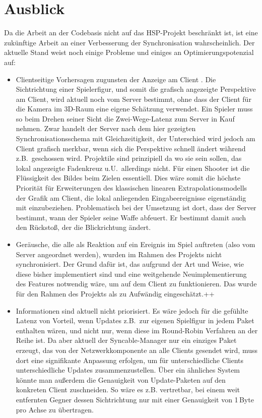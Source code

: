 \section{Ausblick}
Da die Arbeit an der Codebasis nicht auf das HSP-Projekt beschränkt ist, ist eine zukünftige Arbeit an einer Verbesserung der Synchronisation wahrscheinlich. Der aktuelle Stand weist noch einige Probleme und einiges an Optimierungspotenzial auf:
\begin{itemize}
\item Clientseitige Vorhersagen zugunsten der Anzeige am Client \cite[ch. 6.2]{gamenetworking00}. Die Sichtrichtung einer Spielerfigur, und somit die grafisch angezeigte Perspektive am Client, wird aktuell noch vom Server bestimmt, ohne dass der Client für die Kamera im 3D-Raum eine eigene Schätzung verwendet. 
Ein Spieler muss so beim Drehen seiner Sicht die Zwei-Wege-Latenz zum Server in Kauf nehmen. Zwar handelt der Server nach dem hier gezeigten Synchronisationsschema mit Gleichzeitigkeit, der Unterschied wird jedoch am Client grafisch merkbar, wenn sich die Perspektive schnell ändert während z.B.~geschossen wird. Projektile sind prinzipiell da wo sie sein sollen, das lokal angezeigte Fadenkreuz u.U.~allerdings nicht. Für einen Shooter ist die Flüssigkeit des Bildes  beim Zielen essentiell.
Dies wäre somit die höchste Priorität für Erweiterungen des klassischen linearen Extrapolationsmodells der Grafik am Client, die lokal anliegenden Eingabeereignisse eigenständig mit einzubeziehen. Problematisch bei der Umsetzung ist dort, dass der Server bestimmt, wann der Spieler seine Waffe abfeuert. Er bestimmt damit auch den Rückstoß, der die Blickrichtung ändert.
\item Geräusche, die alle als Reaktion auf ein Ereignis im Spiel auftreten (also vom Server angeordnet werden), wurden im Rahmen des Projekts nicht synchronisiert. Der Grund dafür ist, das aufgrund der Art und Weise, wie diese bisher implementiert sind und eine weitgehende Neuimplementierung des Features notwendig wäre, um auf dem Client zu funktionieren. Das wurde für den Rahmen des Projekts als zu Aufwändig eingeschätzt.++
\item Informationen sind aktuell nicht priorisiert. Es wäre jedoch für die gefühlte Latenz von Vorteil, wenn Updates z.B.~zur eigenen Spielfigur in jedem Paket enthalten wären, und nicht nur, wenn diese im Round-Robin Verfahren an der Reihe ist. Da aber aktuell der Syncable-Manager nur ein einziges Paket erzeugt, das von der Netzwerkkomponente an alle Clients gesendet wird, muss dort eine signifikante Anpassung erfolgen, um für unterschiedliche Clients unterschiedliche Updates zusammenzustellen. Über ein ähnliches System könnte man außerdem die Genauigkeit von Update-Paketen auf den konkreten Client zuschneiden. So wäre es z.B. vertretbar, bei einem weit entfernten Gegner dessen Sichtrichtung nur mit einer Genauigkeit von 1\,Byte pro Achse zu übertragen.

\end{itemize}

